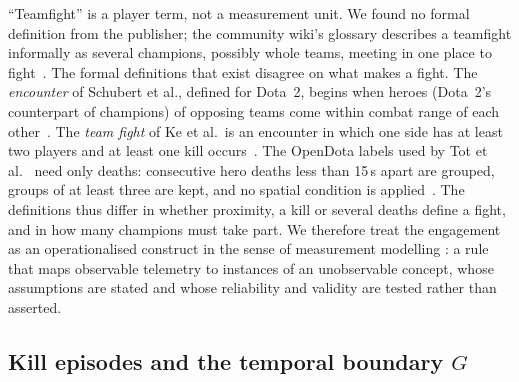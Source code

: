 ``Teamfight'' is a player term, not a measurement unit. We found no formal definition from the
publisher; the community wiki's glossary describes a teamfight informally as several champions,
possibly whole teams, meeting in one place to fight~\cite{lolwiki2026terminology}.
The formal definitions that exist disagree on what makes a fight. The \emph{encounter} of Schubert et
al., defined for Dota~2, begins when heroes (Dota~2's counterpart of champions) of opposing teams come
within combat range of each other~\cite{schubert2016encounter}.
The \emph{team fight} of Ke et al.\ is an encounter in which one side has at least two players and at
least one kill occurs~\cite{ke2022}. The OpenDota labels used by Tot et al.~\cite{tot2021camera} need
only deaths: consecutive hero deaths less than 15\,s apart are grouped, groups of at least three are
kept, and no spatial condition is applied~\cite{opendota2018processteamfights}. The definitions thus
differ in whether proximity, a kill or several deaths define a fight, and in how many champions must
take part.
We therefore treat the engagement as an operationalised construct in the sense of measurement modelling
\cite{jacobs2021measurement}: a rule that maps observable telemetry to instances of an unobservable
concept, whose assumptions are stated and whose reliability and validity are tested rather than
asserted.

\subsection{Kill episodes and the temporal boundary \texorpdfstring{$G$}{G}}

